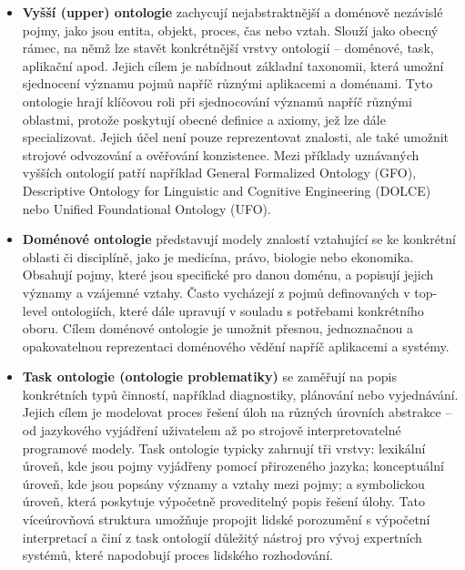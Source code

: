 \begin{itemize}
  \item \textbf{Vyšší (upper) ontologie} zachycují nejabstraktnější a doménově nezávislé pojmy, jako jsou entita, objekt, proces, čas nebo vztah. Slouží jako obecný rámec, na němž lze stavět konkrétnější vrstvy ontologií – doménové, task, aplikační apod. Jejich cílem je nabídnout základní taxonomii, která umožní sjednocení významu pojmů napříč různými aplikacemi a doménami.
  Tyto ontologie hrají klíčovou roli při sjednocování významů napříč různými oblastmi, protože poskytují obecné definice a axiomy, jež lze dále specializovat. Jejich účel není pouze reprezentovat znalosti, ale také umožnit strojové odvozování a ověřování konzistence. \cite{Niles2001}
  Mezi příklady uznávaných vyšších ontologií patří například General Formalized Ontology (GFO), Descriptive Ontology for Linguistic and Cognitive Engineering (DOLCE) nebo Unified Foundational Ontology (UFO). \cite{Guizzardi2015}

  \item \textbf{Doménové ontologie} představují modely znalostí vztahující se ke konkrétní oblasti či disciplíně, jako je medicína, právo, biologie nebo ekonomika. Obsahují pojmy, které jsou specifické pro danou doménu, a popisují jejich významy a vzájemné vztahy. Často vycházejí z pojmů definovaných v top-level ontologiích, které dále upravují v souladu s potřebami konkrétního oboru. Cílem doménové ontologie je umožnit přesnou, jednoznačnou a opakovatelnou reprezentaci doménového vědění napříč aplikacemi a systémy. \cite{Cristani2008}
  
  \item \textbf{Task ontologie (ontologie problematiky)} se zaměřují na popis konkrétních typů činností, například diagnostiky, plánování nebo vyjednávání. Jejich cílem je modelovat proces řešení úloh na různých úrovních abstrakce – od jazykového vyjádření uživatelem až po strojově interpretovatelné programové modely. Task ontologie typicky zahrnují tři vrstvy: lexikální úroveň, kde jsou pojmy vyjádřeny pomocí přirozeného jazyka; konceptuální úroveň, kde jsou popsány významy a vztahy mezi pojmy; a symbolickou úroveň, která poskytuje výpočetně proveditelný popis řešení úlohy. Tato víceúrovňová struktura umožňuje propojit lidské porozumění s výpočetní interpretací a činí z task ontologií důležitý nástroj pro vývoj expertních systémů, které napodobují proces lidského rozhodování. \cite{Ikeda1998}
  

\end{itemize}
